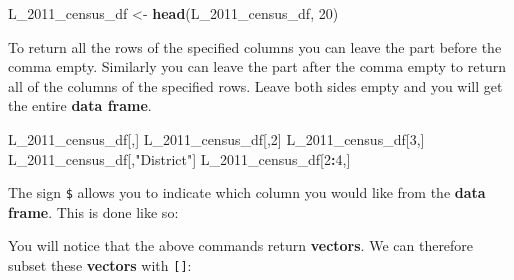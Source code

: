 \documentclass[]{book}
\newenvironment{Shaded}{\begin{snugshade}}{\end{snugshade}}
\newcommand{\KeywordTok}[1]{\textcolor[rgb]{0.13,0.29,0.53}{\textbf{#1}}}
\newcommand{\DecValTok}[1]{\textcolor[rgb]{0.00,0.00,0.81}{#1}}
\newcommand{\StringTok}[1]{\textcolor[rgb]{0.31,0.60,0.02}{#1}}
\newcommand{\OperatorTok}[1]{\textcolor[rgb]{0.81,0.36,0.00}{\textbf{#1}}}
\newcommand{\NormalTok}[1]{#1}
\begin{document}
\begin{Shaded}
\begin{Highlighting}[]
\NormalTok{L_2011_census_df <-}\StringTok{ }\KeywordTok{head}\NormalTok{(L_2011_census_df, }\DecValTok{20}\NormalTok{)}
\end{Highlighting}
\end{Shaded}

To return all the rows of the specified columns you can leave the part
before the comma empty. Similarly you can leave the part after the comma
empty to return all of the columns of the specified rows. Leave both
sides empty and you will get the entire \textbf{data frame}.

\begin{Shaded}
\begin{Highlighting}[]
\NormalTok{L_2011_census_df[,]}
\NormalTok{L_2011_census_df[,}\DecValTok{2}\NormalTok{]}
\NormalTok{L_2011_census_df[}\DecValTok{3}\NormalTok{,]}
\NormalTok{L_2011_census_df[,}\StringTok{"District"}\NormalTok{]}
\NormalTok{L_2011_census_df[}\DecValTok{2}\OperatorTok{:}\DecValTok{4}\NormalTok{,]}
\end{Highlighting}
\end{Shaded}

The sign \texttt{\$} allows you to indicate which column you would like
from the \textbf{data frame}. This is done like so:

\begin{Shaded}
\end{Shaded}

You will notice that the above commands return \textbf{vectors}. We can
therefore subset these \textbf{vectors} with \texttt{{[}{]}}:

\begin{Shaded}
\end{Shaded}
\end{document}
